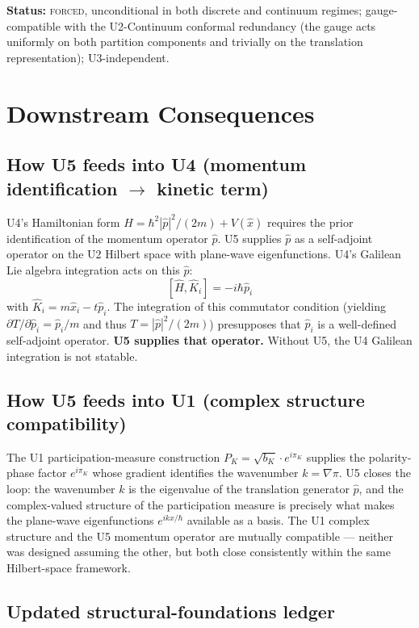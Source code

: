 \documentclass[11pt,a4paper]{article}
\begin{document}
\textbf{Status:} \textsc{forced}, unconditional in both discrete and continuum regimes; gauge-compatible with the U2-Continuum conformal redundancy (the gauge acts uniformly on both partition components and trivially on the translation representation); U3-independent.

\section{Downstream Consequences}\label{sec:downstream}

\subsection{How U5 feeds into U4 (momentum identification $\to$ kinetic term)}

U4's Hamiltonian form $\hat{H} = \hbar^2 |\hat{p}|^2 / (2m) + V(\hat{x})$ requires the prior identification of the momentum operator $\hat{p}$. U5 supplies $\hat{p}$ as a self-adjoint operator on the U2 Hilbert space with plane-wave eigenfunctions. U4's Galilean Lie algebra integration acts on this $\hat{p}$:
\[
[\hat{H}, \hat{K}_i] = -i\hbar \hat{p}_i
\]
with $\hat{K}_i = m\hat{x}_i - t\hat{p}_i$. The integration of this commutator condition (yielding $\partial T / \partial \hat{p}_i = \hat{p}_i / m$ and thus $T = |\hat{p}|^2 / (2m)$) presupposes that $\hat{p}_i$ is a well-defined self-adjoint operator. \textbf{U5 supplies that operator.} Without U5, the U4 Galilean integration is not statable.

\subsection{How U5 feeds into U1 (complex structure compatibility)}

The U1 participation-measure construction $P_K = \sqrt{b_K} \cdot e^{i\pi_K}$ supplies the polarity-phase factor $e^{i\pi_K}$ whose gradient identifies the wavenumber $k = \nabla \pi$. U5 closes the loop: the wavenumber $k$ is the eigenvalue of the translation generator $\hat{p}$, and the complex-valued structure of the participation measure is precisely what makes the plane-wave eigenfunctions $e^{ikx/\hbar}$ available as a basis. The U1 complex structure and the U5 momentum operator are mutually compatible --- neither was designed assuming the other, but both close consistently within the same Hilbert-space framework.

\subsection{Updated structural-foundations ledger}
\end{document}
